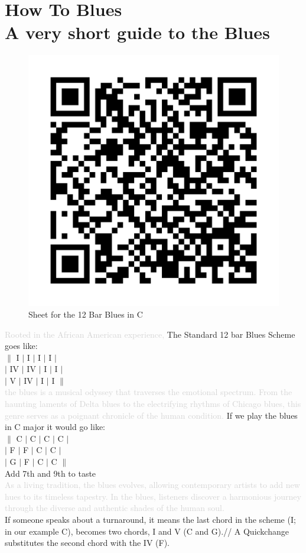 \chapter[How To Blues]{How To Blues\\[1ex]\large{A very short guide to the Blues}}

\begin{figure}
\includegraphics[width=1\linewidth]{QR_Codes/QR_12BarBlues.png}\\
Sheet for the 12 Bar Blues in C
\end{figure}

\textcolor{lightgray}{Rooted in the African American experience,}
The Standard 12 bar Blues Scheme goes like:\\
$\|$ I $|$ I $|$ I $|$ I $|$\\
$|$ IV $|$ IV $|$ I $|$ I $|$\\
$|$ V $|$ IV $|$ I $|$ I $\|$\\
\textcolor{lightgray}{the blues is a musical odyssey that traverses the emotional spectrum. From the haunting laments of Delta blues to the electrifying rhythms of Chicago blues, this genre serves as a poignant chronicle of the human condition.} If we play the blues in C major it would go like:\\
$\|$ C $|$ C $|$ C $|$ C $|$\\
$|$ F $|$ F $|$ C $|$ C $|$\\
$|$ G $|$ F $|$ C $|$ C $\|$\\

Add 7th and 9th to taste\\
\textcolor{lightgray}{As a living tradition, the blues evolves, allowing contemporary artists to add new hues to its timeless tapestry. In the blues, listeners discover a harmonious journey through the diverse and authentic shades of the human soul.}\\
If someone speaks about a turnaround, it means the last chord in the scheme (I; in our example C), becomes two chords, I and V (C and G).//
A Quickchange substitutes the second chord with the IV (F).
